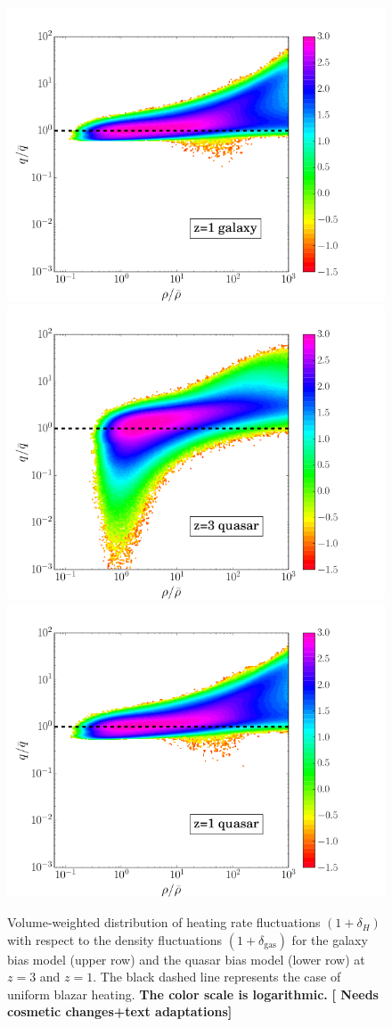 \documentclass[numberedappendix]{emulateapj}
\newcommand\ALc[1]{{\color{red} \bf #1}} %
\begin{document}
{\begin{figure}[h]
\includegraphics[width = .45\textwidth ]{delta_deltah_z1_gal2_ok.png}\\
\includegraphics[width = .45\textwidth ]{delta_deltah_z3_qso4_512b.png}
\includegraphics[width = .45\textwidth ]{delta_deltah_z1_qso4_512b.png}
\caption{Volume-weighted distribution of heating rate fluctuations $(1+\delta_H)$ with respect to the density fluctuations $(1+\delta_{\mathrm{gas}})$ for the galaxy bias model (upper row) and the quasar bias model (lower row) at $z=3$ and $z=1$. The black dashed line represents the case of uniform blazar heating. \ALc{The color scale is logarithmic.} \ALc{[{ Needs cosmetic changes+text adaptations}]}}
\label{fig:deltas}
\end{figure}
}
\end{document}
